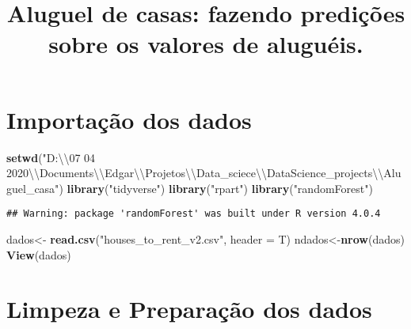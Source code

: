 \documentclass[
]{article}
\title{Aluguel de casas: fazendo predições sobre os valores de
aluguéis.}
\author{}
\date{\vspace{-2.5em}}
\newenvironment{Shaded}{\begin{snugshade}}{\end{snugshade}}
\newcommand{\CharTok}[1]{\textcolor[rgb]{0.31,0.60,0.02}{#1}}
\newcommand{\DataTypeTok}[1]{\textcolor[rgb]{0.13,0.29,0.53}{#1}}
\newcommand{\KeywordTok}[1]{\textcolor[rgb]{0.13,0.29,0.53}{\textbf{#1}}}
\newcommand{\NormalTok}[1]{#1}
\newcommand{\StringTok}[1]{\textcolor[rgb]{0.31,0.60,0.02}{#1}}
\begin{document}
\maketitle

\hypertarget{importauxe7uxe3o-dos-dados}{%
\section{Importação dos dados}\label{importauxe7uxe3o-dos-dados}}

\begin{Shaded}
\begin{Highlighting}[]
\KeywordTok{setwd}\NormalTok{(}\StringTok{"D:}\CharTok{\textbackslash{}\textbackslash{}}\StringTok{07 04 2020}\CharTok{\textbackslash{}\textbackslash{}}\StringTok{Documents}\CharTok{\textbackslash{}\textbackslash{}}\StringTok{Edgar}\CharTok{\textbackslash{}\textbackslash{}}\StringTok{Projetos}\CharTok{\textbackslash{}\textbackslash{}}\StringTok{Data\_sciece}\CharTok{\textbackslash{}\textbackslash{}}\StringTok{DataScience\_projects}\CharTok{\textbackslash{}\textbackslash{}}\StringTok{Aluguel\_casa"}\NormalTok{)}
\KeywordTok{library}\NormalTok{(}\StringTok{"tidyverse"}\NormalTok{)}
\KeywordTok{library}\NormalTok{(}\StringTok{"rpart"}\NormalTok{)}
\KeywordTok{library}\NormalTok{(}\StringTok{"randomForest"}\NormalTok{)}
\end{Highlighting}
\end{Shaded}

\begin{verbatim}
## Warning: package 'randomForest' was built under R version 4.0.4
\end{verbatim}

\begin{Shaded}
\begin{Highlighting}[]
\NormalTok{dados\textless{}{-}}\StringTok{ }\KeywordTok{read.csv}\NormalTok{(}\StringTok{"houses\_to\_rent\_v2.csv"}\NormalTok{, }\DataTypeTok{header =}\NormalTok{ T)}
\NormalTok{ndados\textless{}{-}}\KeywordTok{nrow}\NormalTok{(dados) }
\KeywordTok{View}\NormalTok{(dados)}
\end{Highlighting}
\end{Shaded}

\hypertarget{limpeza-e-preparauxe7uxe3o-dos-dados}{%
\section{Limpeza e Preparação dos
dados}\label{limpeza-e-preparauxe7uxe3o-dos-dados}}
\end{document}
